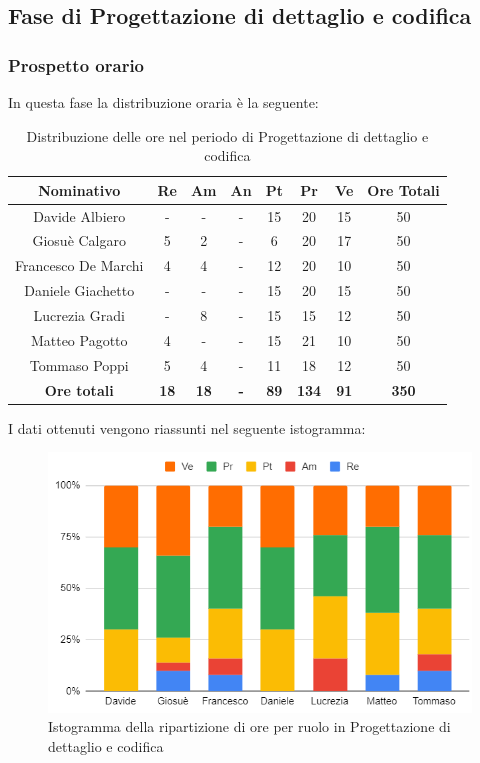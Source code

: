 \subsection{Fase di Progettazione di dettaglio e codifica}
\subsubsection{Prospetto orario}
In questa fase la distribuzione oraria è la seguente:
\begin{table}[H]
		\begin{center}
			\setlength{\aboverulesep}{0pt}
			\setlength{\belowrulesep}{0pt}
			\setlength{\extrarowheight}{.75ex}
			\begin{tabular}{ c c c c c c c c }
				\rowcolor{AzzurroGruppo!30} 
				\textbf{Nominativo} & \textbf{Re} & \textbf{Am} & \textbf{An} & \textbf{Pt} & \textbf{Pr} & \textbf{Ve} & \textbf{Ore Totali}  \\
				\toprule
				Davide Albiero       & - & - & - & 15 & 20 & 15 & 50 \\
				Giosuè Calgaro      & 5 & 2 & - & 6 & 20 & 17 & 50 \\
				Francesco De Marchi & 4 & 4 & - & 12 & 20 & 10 & 50 \\
				Daniele Giachetto  & - & - & - & 15 & 20 & 15 & 50 \\
				Lucrezia Gradi      & - & 8 & - & 15 & 15 & 12 & 50 \\
				Matteo Pagotto      & 4 & - & - & 15 & 21 & 10 & 50 \\
				Tommaso Poppi       & 5 & 4 & - & 11 & 18 & 12 & 50 \\
				 \textbf{Ore totali} & \textbf{18} & \textbf{18} & \textbf{-} & \textbf{89} & \textbf{134} & \textbf{91} & \textbf{350} \\
				\bottomrule
			\end{tabular}
			\caption{Distribuzione delle ore nel periodo di Progettazione di dettaglio e codifica}
		\end{center}
	\end{table}
	I dati ottenuti vengono riassunti nel seguente istogramma:
\begin{figure}[H]
    \centering
    \includegraphics[scale = 0.5]{components/img/dettaglio_isto.png}
    \caption{Istogramma della ripartizione di ore per ruolo in Progettazione di dettaglio e codifica}
    \label{fig:istogramma ripartizione ore , fase di Progettazione di dettaglio e codifica}
\end{figure}
